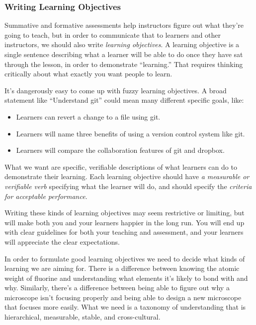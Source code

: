\subsubsection*{Writing Learning Objectives}

Summative and formative assessments help instructors figure out what they're going to teach,
but in order to communicate that to learners and other instructors,
we should also write \emph{learning objectives}. A 
learning objective is a single sentence describing what a learner will be 
able to do once they have sat through the lesson, in order to demonstrate 
``learning.''  That requires thinking critically about what exactly you want 
people to learn.

It's dangerously easy to come up with fuzzy learning objectives.  A 
broad statement like ``Understand git'' could 
mean many different specific goals, like:

\begin{itemize}
\item Learners can revert a change to a file using git.
\item Learners will name three benefits of using a version control system like git.
\item Learners will compare the collaboration features of git and dropbox.
\end{itemize}

What we want are specific, verifiable descriptions of what learners can do to demonstrate their learning.
Each learning objective should have \emph{a measurable or verifiable verb} specifying what the learner will do,
and should specify the \emph{criteria for acceptable performance}.

Writing these kinds of learning objectives may seem restrictive or limiting, but 
will make both you and your learners happier in the long run.  You will 
end up with clear guidelines for both your teaching and assessment, 
and your learners will appreciate the clear expectations.

In order to formulate good learning objectives we need to decide what kinds of learning we are aiming for.
There is a difference between knowing the atomic weight of fluorine
and understanding what elements it's likely to bond with and why.
Similarly,
there's a difference between being able to figure out why a microscope isn't focusing properly
and being able to design a new microscope that focuses more easily.
What we need is a taxonomy of understanding
that is hierarchical, measurable, stable, and cross-cultural.

